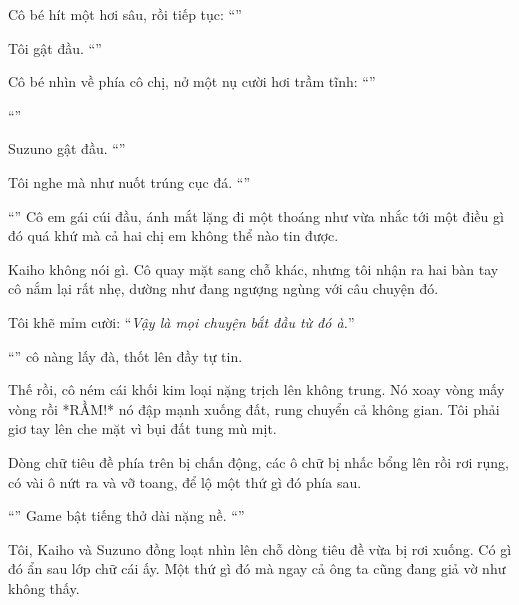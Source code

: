 \documentclass[../main.tex]{subfiles}
\begin{document}
Cô bé hít một hơi sâu, rồi tiếp tục: ``''

Tôi gật đầu. ``''

Cô bé nhìn về phía cô chị, nở một nụ cười hơi trầm tĩnh: ``''

``''

Suzuno gật đầu. ``''

Tôi nghe mà như nuốt trúng cục đá. ``''

``'' Cô em gái cúi đầu, ánh mắt lặng đi một thoáng như vừa nhắc tới một điều gì đó quá khứ mà cả hai chị em không thể nào tin được.

Kaiho không nói gì. Cô quay mặt sang chỗ khác, nhưng tôi nhận ra hai bàn tay cô nắm lại rất nhẹ, dường như đang ngượng ngùng với câu chuyện đó.

Tôi khẽ mỉm cười: ``\textit{Vậy là mọi chuyện bắt đầu từ đó à.}''

``'' cô nàng lấy đà, thốt lên đầy tự tin.

Thế rồi, cô ném cái khối kim loại nặng trịch lên không trung. Nó xoay vòng mấy vòng rồi *RẦM!* nó đập mạnh xuống đất, rung chuyển cả không gian. Tôi phải giơ tay lên che mặt vì bụi đất tung mù mịt.

Dòng chữ tiêu đề phía trên bị chấn động, các ô chữ bị nhấc bổng lên rồi rơi rụng, có vài ô nứt ra và vỡ toang, để lộ một thứ gì đó phía sau.


``'' Game bật tiếng thở dài nặng nề. ``''

Tôi, Kaiho và Suzuno đồng loạt nhìn lên chỗ dòng tiêu đề vừa bị rơi xuống. Có gì đó ẩn sau lớp chữ cái ấy. Một thứ gì đó mà ngay cả ông ta cũng đang giả vờ như không thấy.
\end{document}
